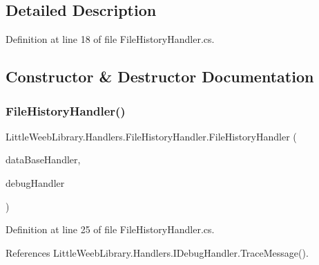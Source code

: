 \subsection{Detailed Description}


Definition at line 18 of file File\+History\+Handler.\+cs.



\subsection{Constructor \& Destructor Documentation}
\mbox{\label{class_little_weeb_library_1_1_handlers_1_1_file_history_handler_ab8aa730a5d9db1b2624723394bd06191}} 
\subsubsection{\texorpdfstring{File\+History\+Handler()}{FileHistoryHandler()}}
{\footnotesize\ttfamily Little\+Weeb\+Library.\+Handlers.\+File\+History\+Handler.\+File\+History\+Handler (\begin{DoxyParamCaption}\item[{\mbox{\hyperlink{interface_little_weeb_library_1_1_handlers_1_1_i_data_base_handler}{I\+Data\+Base\+Handler}}}]{data\+Base\+Handler,  }\item[{\mbox{\hyperlink{interface_little_weeb_library_1_1_handlers_1_1_i_debug_handler}{I\+Debug\+Handler}}}]{debug\+Handler }\end{DoxyParamCaption})}



Definition at line 25 of file File\+History\+Handler.\+cs.



References Little\+Weeb\+Library.\+Handlers.\+I\+Debug\+Handler.\+Trace\+Message().


